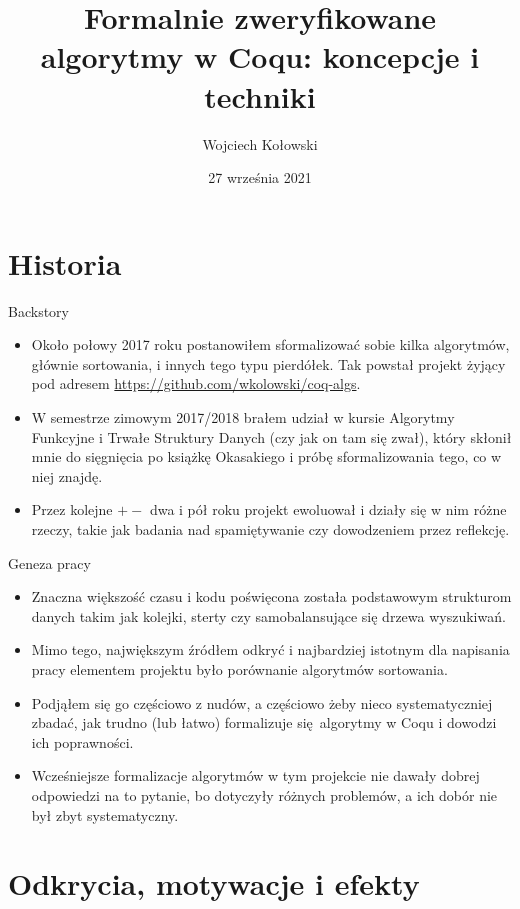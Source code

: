 \documentclass{beamer}
\title{Formalnie zweryfikowane algorytmy w Coqu: koncepcje i techniki}
\author{Wojciech Kołowski}
\date{27 września 2021}
\begin{document}
\frame{\titlepage}

\frame{\tableofcontents}

\section{Historia}

\begin{frame}{Backstory}
\begin{itemize}
	\item Około połowy 2017 roku postanowiłem sformalizować sobie kilka algorytmów, głównie sortowania, i innych tego typu pierdółek. Tak powstał projekt żyjący pod adresem \url{https://github.com/wkolowski/coq-algs}.
	\item W semestrze zimowym 2017/2018 brałem udział w kursie Algorytmy Funkcyjne i Trwałe Struktury Danych (czy jak on tam się zwał), który skłonił mnie do sięgnięcia po książkę Okasakiego i próbę sformalizowania tego, co w niej znajdę.
	\item Przez kolejne $+-$ dwa i pół roku projekt ewoluował i działy się w nim różne rzeczy, takie jak badania nad spamiętywanie czy dowodzeniem przez reflekcję.
\end{itemize}
\end{frame}

\begin{frame}{Geneza pracy}
\begin{itemize}
	\item Znaczna większość czasu i kodu poświęcona została podstawowym strukturom danych takim jak kolejki, sterty czy samobalansujące się drzewa wyszukiwań.
	\item Mimo tego, największym źródłem odkryć i najbardziej istotnym dla napisania pracy elementem projektu było porównanie algorytmów sortowania.
	\item Podjąłem się go częściowo z nudów, a częściowo żeby nieco systematyczniej zbadać, jak trudno (lub łatwo) formalizuje się algorytmy w Coqu i dowodzi ich poprawności.
	\item Wcześniejsze formalizacje algorytmów w tym projekcie nie dawały dobrej odpowiedzi na to pytanie, bo dotyczyły różnych problemów, a ich dobór nie był zbyt systematyczny.
\end{itemize}
\end{frame}

\section{Odkrycia, motywacje i efekty}
\end{document}
